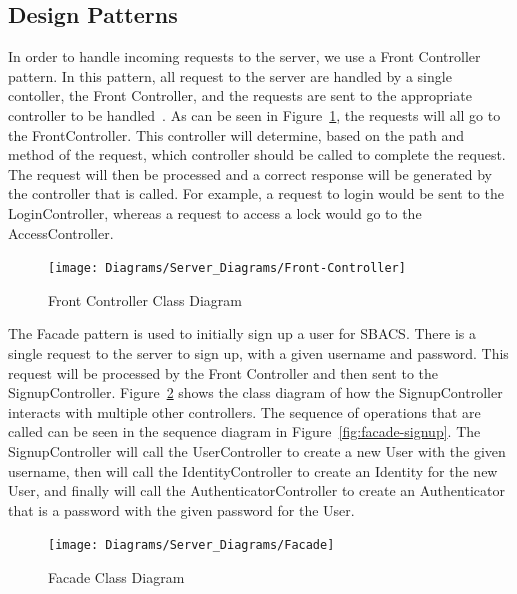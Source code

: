 \documentclass[12pt]{report}
\let\Oldsubsection\subsection
\renewcommand{\subsection}{\FloatBarrier\Oldsubsection}
\begin{document}
\subsection{Design Patterns} \label{design-patterns}
	


In order to handle incoming requests to the server, we use a Front Controller pattern. In this pattern,
all request to the server are handled by a single contoller, the Front Controller, and the requests
are sent to the appropriate controller to be handled~\autocite{FRONTCONTROLLER}. As can be seen in
Figure~\ref{fig:front-controller},
the requests will all go to the FrontController. This controller will determine, based on the path and
method of the request, which controller should be called to complete the request. The request will then
be processed and a correct response will be generated by the controller that is called. For example,
a request to login would be sent to the LoginController, whereas a request to access a lock would go 
to the AccessController.

\begin{figure}
    \texttt{[image: Diagrams/Server\_Diagrams/Front-Controller]}
    \caption{Front Controller Class Diagram}
    \label{fig:front-controller}
\end{figure}

The Facade pattern is used to initially sign up a user for SBACS. There is a single request to the
server to sign up, with a given username and password. This request will be processed by the
Front Controller and then sent to the SignupController. Figure~\ref{fig:facade-server} shows the
class diagram of how the SignupController interacts with multiple other controllers. The sequence
of operations that are called can be seen in the sequence diagram in Figure~\ref{fig:facade-signup}.
The SignupController will call the UserController
to create a new User with the given username, then will call the IdentityController to create an Identity
for the new User, and finally will call the AuthenticatorController to create an Authenticator that is
a password with the given password for the User. 

\begin{figure}
    \texttt{[image: Diagrams/Server\_Diagrams/Facade]}
    \caption{Facade Class Diagram}
    \label{fig:facade-server}
\end{figure}
\end{document}
